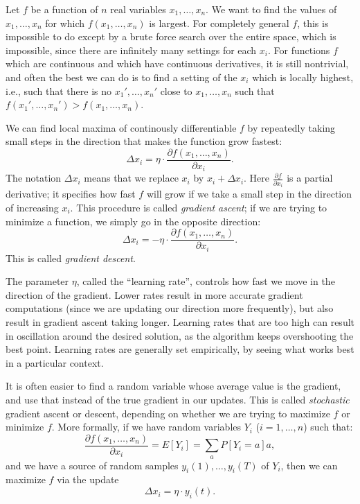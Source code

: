\documentclass{article}
\theoremstyle{definition}
\begin{document}
Let $f$ be a function of $n$ real variables $x_1, \dots, x_n$. We want
to find the values of $x_1, \dots, x_n$ for which $f(x_1, \dots, x_n)$
is largest. For completely general $f$, this is impossible to do
except by a brute force search over the entire space, which is
impossible, since there are infinitely many settings for each
$x_i$. For functions $f$ which are continuous and which have
continuous derivatives, it is still nontrivial, and often the best we
can do is to find a setting of the $x_i$ which is locally highest,
i.e., such that there is no $x_1', \dots, x_n'$ close to $x_1, \dots,
x_n$ such that $f(x_1', \dots, x_n') > f(x_1, \dots, x_n)$.

We can find local maxima of continously differentiable $f$ by
repeatedly taking small steps in the direction that makes the function
grow fastest:
$$\Delta x_i = \eta \cdot \frac{\partial f(x_1, \dots, x_n)}{\partial
  x_i}.$$ 
The notation $\Delta x_i$ means that we replace $x_i$ by $x_i + \Delta
x_i$.  Here $\frac{\partial f}{\partial x_i}$ is a partial derivative;
it specifies how fast $f$ will grow if we take a small step in the
direction of increasing $x_i$. This procedure is called {\em gradient
  ascent}; if we are trying to minimize a function, we simply go in
the opposite direction:
$$\Delta x_i = -\eta \cdot \frac{\partial f(x_1, \dots, x_n)}{\partial
  x_i}.$$ This is called {\em gradient descent}.

The parameter $\eta$, called the ``learning rate'', controls how fast
we move in the direction of the gradient. Lower rates result in more
accurate gradient computations (since we are updating our direction
more frequently), but also result in gradient ascent taking
longer. Learning rates that are too high can result in oscillation
around the desired solution, as the algorithm keeps overshooting the
best point. Learning rates are generally set empirically, by seeing
what works best in a particular context.

It is often easier to find a random variable whose average value is
the gradient, and use that instead of the true gradient in our
updates. This is called {\em stochastic} gradient ascent or descent,
depending on whether we are trying to maximize $f$ or minimize $f$.
More formally, if we have random variables $Y_i$ ($i=1, \dots, n$)
such that:
$$\frac{\partial f(x_1, \dots, x_n)}{\partial x_i} = E[Y_i] = \sum_a P[Y_i=a]
a,$$ and we have a source of random samples $y_i(1), \dots, y_i(T)$
of $Y_i$, then we can maximize $f$ via the update
$$\Delta x_i = \eta \cdot y_i(t).$$ 
\end{document}
